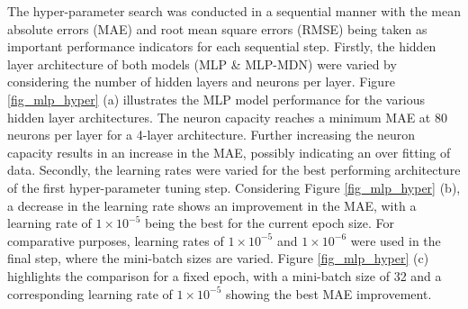 \documentclass[a4paper,fleqn]{cas-dc}
\begin{document}
The hyper-parameter search was conducted in a sequential manner with the mean absolute errors (MAE) and root mean square errors (RMSE) being taken as important performance indicators for each sequential step. Firstly, the hidden layer architecture of both models (MLP \& MLP-MDN) were varied by considering the number of hidden layers and neurons per layer. Figure \ref{fig_mlp_hyper} (a) illustrates the MLP model performance for the various hidden layer architectures. The neuron capacity reaches a minimum MAE at 80 neurons per layer for a 4-layer architecture. Further increasing the neuron capacity results in an increase in the MAE, possibly indicating an over fitting of data. Secondly, the learning rates were varied for the best performing architecture of the first hyper-parameter tuning step. Considering Figure \ref{fig_mlp_hyper} (b), a decrease in the learning rate shows an improvement in the MAE, with a learning rate of $1\times10^{-5}$ being the best for the current epoch size. For comparative purposes, learning rates of $1\times10^{-5}$ and $1\times10^{-6}$ were used in the final step, where the mini-batch sizes are varied. Figure \ref{fig_mlp_hyper} (c) highlights the comparison for a fixed epoch, with a mini-batch size of 32 and a corresponding learning rate of $1\times10^{-5}$ showing the best MAE improvement.\\
\end{document}
